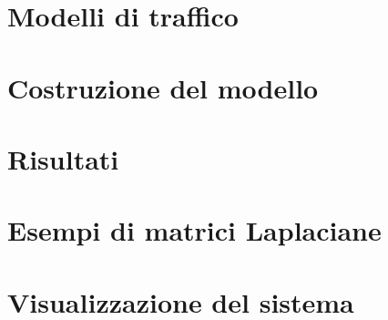 \documentclass[12pt,a4paper]{report}
\begin{document}
\chapter{Modelli di traffico}


\newpage
\thispagestyle{empty}
\mbox{}

\chapter{Costruzione del modello}


\chapter{Risultati}


\appendix

\newpage
\thispagestyle{empty}
\mbox{}

\chapter{Esempi di matrici Laplaciane}
\label{appendix:laplacian}

\chapter{Visualizzazione del sistema}
\label{appendix:visual}


\newpage
\thispagestyle{empty}
\mbox{}

\printbibliography
\end{document}
